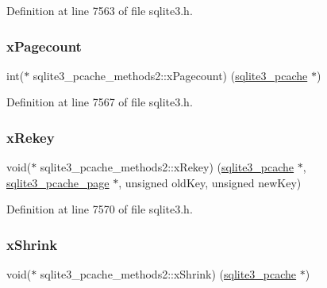 Definition at line 7563 of file sqlite3.\+h.

\mbox{\label{structsqlite3__pcache__methods2_a16b85f7889b050702c739eccf2f0c036}} 
\subsubsection{\texorpdfstring{x\+Pagecount}{xPagecount}}
{\footnotesize\ttfamily int($\ast$ sqlite3\+\_\+pcache\+\_\+methods2\+::x\+Pagecount) (\mbox{\hyperlink{sqlite3_8h_a096c453d937d51f7926d7d31c8e0bd2f}{sqlite3\+\_\+pcache}} $\ast$)}



Definition at line 7567 of file sqlite3.\+h.

\mbox{\label{structsqlite3__pcache__methods2_ad5b7609bdc0d2ae80325f7925b76c0af}} 
\subsubsection{\texorpdfstring{x\+Rekey}{xRekey}}
{\footnotesize\ttfamily void($\ast$ sqlite3\+\_\+pcache\+\_\+methods2\+::x\+Rekey) (\mbox{\hyperlink{sqlite3_8h_a096c453d937d51f7926d7d31c8e0bd2f}{sqlite3\+\_\+pcache}} $\ast$, \mbox{\hyperlink{structsqlite3__pcache__page}{sqlite3\+\_\+pcache\+\_\+page}} $\ast$, unsigned old\+Key, unsigned new\+Key)}



Definition at line 7570 of file sqlite3.\+h.

\mbox{\label{structsqlite3__pcache__methods2_a225971a193ff429d9f1339aca39c7755}} 
\subsubsection{\texorpdfstring{x\+Shrink}{xShrink}}
{\footnotesize\ttfamily void($\ast$ sqlite3\+\_\+pcache\+\_\+methods2\+::x\+Shrink) (\mbox{\hyperlink{sqlite3_8h_a096c453d937d51f7926d7d31c8e0bd2f}{sqlite3\+\_\+pcache}} $\ast$)}




